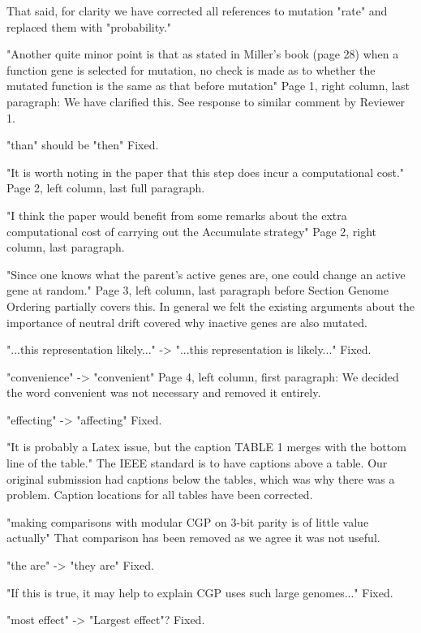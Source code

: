 \documentclass{letter}
\begin{document}
\begin{letter}{}
That said, for clarity we have corrected all references to mutation "rate" and replaced them with "probability."

"Another quite minor point is that as stated in Miller's book (page 28) when a function gene is selected for mutation, no
check is made as to whether the mutated function is the same as that before mutation"
Page 1, right column, last paragraph: We have clarified this.  See response to similar comment by Reviewer 1.

"than" should be "then"
Fixed.

"It is worth noting in the paper that this step does incur a computational cost."
Page 2, left column, last full paragraph.

"I think the paper would benefit from some
remarks about the extra computational cost of carrying out the Accumulate strategy"
Page 2, right column, last paragraph.

"Since one knows what the parent's active genes are, one could change an active gene at random."
Page 3, left column, last paragraph before Section Genome Ordering partially covers this.  In general
we felt the existing arguments about the importance of neutral drift covered why inactive genes are
also mutated.

"...this representation likely..." -> "...this representation is likely..."
Fixed.

"convenience" -> "convenient"
Page 4, left column, first paragraph: We decided the word convenient was not necessary and removed
it entirely.

"effecting" -> "affecting"
Fixed.

"It is probably a Latex issue, but the caption TABLE 1 merges with the bottom line of the table."
The IEEE standard is to have captions above a table.  Our original submission had captions below
the tables, which was why there was a problem.  Caption locations for all tables have been corrected.

"making comparisons with modular CGP on 3-bit parity is of little value actually"
That comparison has been removed as we agree it was not useful.

"the are" -> "they are"
Fixed.

"If this is true, it may help to explain CGP uses such large genomes..."
Fixed.

"most effect" -> "Largest effect"?
Fixed.

\end{letter}
\end{document}
